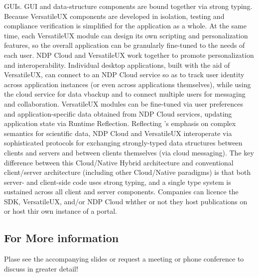 \documentclass[11pt,letterpaper]{article}
\begin{document}
GUIs.  GUI and data-structure components are 
bound together via strong typing.  Because VersatileUX 
components are developed in isolation, testing and 
compliance verification is simplified for the application 
as a whole.  At the same time, each VersatileUX 
module can design its own scripting and personalization 
features, so the overall application can be 
granularly fine-tuned to the needs of each user.
\p{}
NDP Cloud and VersatileUX work together to 
promote personalization and interoperability.  
Individual desktop applications, built 
with the aid of VersatileUX, can connect to an 
NDP Cloud service so as to track user identity across 
application instances (or even across applications themselves), 
while using the cloud service for data vbackup and 
to connect multiple users for messaging and collaboration.  
VersatileUX modules can be fine-tuned via 
user preferences and application-specific data obtained from 
NDP Cloud services, updating application state via 
Runtime Reflection.  Reflecting {\MOSAIC}'s 
emphasis on complex semantics for scientific data, 
NDP Cloud and VersatileUX interoperate via 
sophisticated protocols for exchanging 
strongly-typed data structures between clients and 
servers and between clients themselves (via cloud messaging).  
The key difference between this Cloud/Native Hybrid 
architecture and conventional client/server architecture 
(including other Cloud/Native paradigms) is that 
both server- and client-side code uses 
strong typing, and a single type system is 
sustained across all client and server components.
\p{}
Companies can licence the {\MOSAIC} SDK, VersatileUX, and/or 
NDP Cloud whther or not they 
host publications on {\MOSAIC} or host thir own instance 
of a {\MOSAIC} portal.

\subsection{For More information}
Plase see the accompanying slides or request a meeting 
or phone conference to discuss {\MOSAIC} in greater detail!
\end{document}
